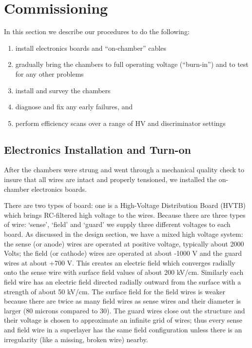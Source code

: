 \section{Commissioning}

In this section we describe our procedures to do the following:

\begin{enumerate}
\item install electronics boards and ``on-chamber'' cables
\item gradually bring the chambers to full operating voltage (``burn-in'') 
and to test for any other problems
\item install and survey the chambers
\item diagnose and fix any early failures, and
\item perform efficiency scans over a range of HV and discriminator settings
\end{enumerate}

\subsection{Electronics Installation and Turn-on}
After the chambers were strung and went through a mechanical quality
check to insure that all wires are intact and properly tensioned, we
installed the on-chamber electronics boards.

There are two types of board: one is a High-Voltage Distribution Board (HVTB)
which brings RC-filtered high voltage to the wires.  Because there are three
types of wire: `sense', `field' and `guard' we supply three different voltages
to each board.  As discussed in the design section, we have a mixed high
voltage system: the sense (or anode) wires are operated at positive voltage,
typically about 2000 Volts; the field (or cathode) wires are operated at
about -1000 V and the guard wires at about +700 V.  This creates an
electric field which converges radially onto the sense wire with surface
field values of about 200 kV/cm.  Similarly each field wire has an
electric field directed radially outward from the surface with a strength
of about 50 kV/cm.  The surface field for the field wires is weaker 
because there are twice as many field wires as sense wires and their
diameter is larger (80 microns compared to 30).  The guard wires
close out the structure and their voltage is chosen to approximate an
infinite grid of wires; thus every sense and field wire in a superlayer
has the same field configuration unless there is an irregularity (like
a missing, broken wire) nearby.

